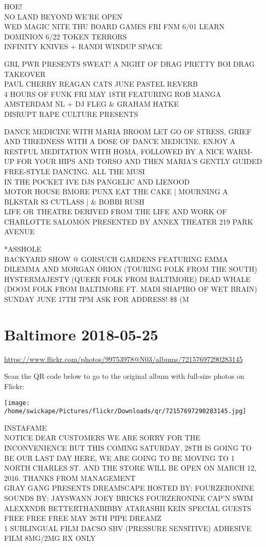 \documentclass[10pt,letterpaper]{article}
\begin{document}
HOE!\\
NO LAND BEYOND WE'RE OPEN\\
WED MAGIC NITE THU BOARD GAMES FRI FNM 6/01 LEARN DOMINION 6/22 TOKEN TERRORS\\
INFINITY KNIVES + RANDI WINDUP SPACE

GRL PWR PRESENTS SWEAT!  A NIGHT OF DRAG PRETTY BOI DRAG TAKEOVER\\
PAUL CHERRY REAGAN CATS JUNE PASTEL REVERB\\
4 HOURS OF FUNK FRI MAY 18TH FEATURING ROB MANGA AMSTERDAM NL + DJ FLEG \& GRAHAM HATKE\\
DISRUPT RAPE CULTURE PRESENTS

DANCE MEDICINE WITH MARIA BROOM LET GO OF STRESS, GRIEF AND TIREDNESS WITH A DOSE OF DANCE MEDICINE.  ENJOY A RESTFUL MEDITATION WITH HOMA, FOLLOWED BY A NICE WARM{-}UP FOR YOUR HIPS AND TORSO AND THEN MARIA'S GENTLY GUIDED FREE{-}STYLE DANCING.  ALL THE MUSI\\
IN THE POCKET IVE DJS PANGELIC AND LIENOOD\\
MOTOR HOUSE BMORE PUNX EAT THE CAKE | MOURNING A BLKSTAR 83 CUTLASS |  \& BOBBI RUSH\\
LIFE OR THEATRE DERIVED FROM THE LIFE AND WORK OF CHARLOTTE SALOMON PRESENTED BY ANNEX THEATER 219 PARK AVENUE

*ASSHOLE\\
BACKYARD SHOW @ GORSUCH GARDENS FEATURING EMMA DILEMMA AND MORGAN ORION (TOURING FOLK FROM THE SOUTH) HYSTERMAJESTY (QUEER FOLK FROM BALTIMORE) DEAD WHALE (DOOM FOLK FROM BALTIMORE FT. MADI SHAPIRO OF WET BRAIN) SUNDAY JUNE 17TH 7PM ASK FOR ADDRESS! \$\$ (M
\pagebreak

\section*{Baltimore 2018-05-25}

\url{https://www.flickr.com/photos/99753978@N03/albums/72157697290283145}

Scan the QR code below to go to the original album with full-size photos on Flickr:

\texttt{[image: /home/swickape/Pictures/flickr/Downloads/qr/72157697290283145.jpg]}
\pagebreak

INSTAFAME\\
NOTICE DEAR CUSTOMERS WE ARE SORRY FOR THE INCONVENIENCE BUT THIS COMING SATURDAY, 28TH IS GOING TO BE OUR LAST DAY HERE, WE ARE GOING TO BE MOVING TO 1 NORTH CHARLES ST. AND THE STORE WILL BE OPEN ON MARCH 12, 2016.  THANKS FROM MANAGEMENT\\
GRAY GANG PRESENTS DREAMSCAPE HOSTED BY: FOURZERONINE SOUNDS BY: JAYSWANN JOEY BRICKS FOURZERONINE CAP'N SWIM ALEXXNDR BETTERTHANBIBBY ATARASHII KEIN SPECIAL GUESTS FREE FREE FREE MAY 26TH PIPE DREAMZ\\
1 SUBLINGUAL FILM DACSO SBV (PRESSURE SENSITIVE) ADHESIVE FILM 8MG/2MG RX ONLY
\end{document}
